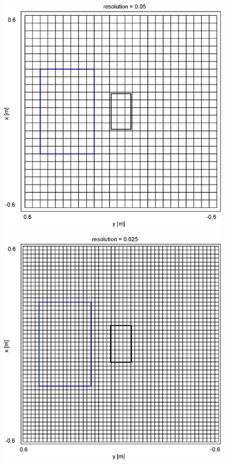 \documentclass[main]{subfiles}
\begin{document}
\begin{figure}[H]
  \centering
  \includegraphics[width = 100 mm]{graph/grid/0.05.eps}
\end{figure}
\begin{figure}[H]
  \centering
  \includegraphics[width = 100 mm]{graph/grid/0.025.eps}
\end{figure}
\end{document}
